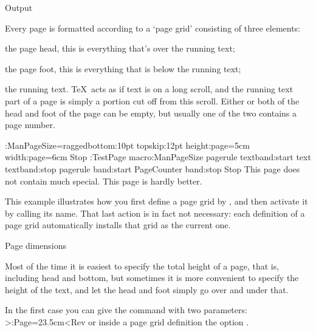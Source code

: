 %
%
%
%
%
%
 Output

Every page is formatted according to a `page grid' consisting of
three elements:

\Enumerate \item the page head, this is everything that's over the
running text;
\item the page foot, this is everything that is below the running
text;
\item the running text. \TeX\ acts as if text is on a long scroll,
and the running text part of a page is simply a portion cut off from
this scroll.\>
Either or both of the head and foot of the page can be empty, but
usually one of the two contains a page number.

\OutExample
\OptionsMacro:ManPageSize=raggedbottom:10pt topskip:12pt
 height:page=5cm width:page=6cm Stop
\DefinePageGrid:TestPage macro:ManPageSize
 pagerule textband:start text textband:stop
 pagerule band:start PageCounter band:stop Stop
\TestPage 
This page does not contain much special.\EjectPage
This page is hardly better.
\OutExampleStop

This example illustrates how you first define a page grid by
, and then activate it by calling its name. That
last action is in fact not necessary: each definition of a page grid
automatically installs that grid as the current one.

\Section Page dimensions

Most of the time it is easiest to specify the total height of a page,
that is, including head and bottom, but sometimes it is more
convenient to specify the height of the text, and let the head and
foot simply go over and under that.

In the first case you can give the command  with
two parameters:
\Ver>\Height:Page=23.5cm<Rev or inside a page grid definition the
option .

